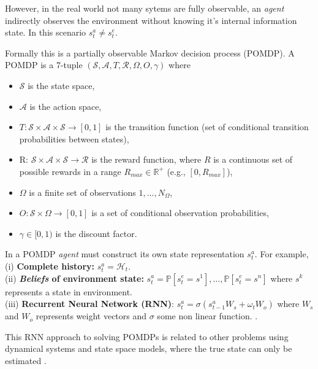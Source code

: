 \vspace{3mm}

However, in the real world not many sytems are fully observable, an {\em agent} indirectly observes the environment without knowing it's internal information state. In this scenario $s_t^a \neq s^e_t$.

Formally this is a partially observable Markov decision process (POMDP).
\vspace{5mm}
A POMDP is a 7-tuple $(\mathcal{S}, \mathcal{A}, T, \mathcal{R}, \Omega, O, \gamma)$ where
\begin{itemize}
  \item[] $\mathcal{S}$ is the state space,
  \item[] $\mathcal{A}$ is the action space,
  \item[] $T : \mathcal{S} \times \mathcal{A}\times \mathcal{S} \rightarrow [0, 1]$ is the transition function (set of conditional
  transition probabilities between states),
  \item[] R: $\mathcal{S} \times \mathcal{A}\times \mathcal{S} \rightarrow \mathcal{R}$ is the reward function, where $R$ is a continuous set of possible rewards in a range $R_{max} \in \mathbb{R}^+$ (e.g., $[0, R_{max}]$),
  \item[] $\Omega$ is a finite set of observations ${1, . . . , N_{\Omega}}$,
  \item[] $O : \mathcal{S} \times \Omega \rightarrow [0, 1]$ is a set of conditional observation probabilities,
  \item[] $\gamma \in  [0, 1)$ is the discount factor.
\end{itemize}


In a POMDP {\em agent} must construct its own state representation $s_t^a$. For example,\\
(i) \textbf{Complete history:} $s_t^a = \mathcal{H}_t$.\\
(ii) \textbf{{\em Beliefs} of environment state:} $s_t^a = \mathbb{P}[s_t^e = s^1],\ldots,\mathbb{P}[s_t^e = s^n]$ where $s^k$ represents a state in environment.\\
(iii) \textbf{Recurrent Neural Network (RNN)}: $s_t^a = \sigma(s_{t-1}^a W_s + \omega_t W_o)$ where $W_s$ and $W_o$ represents weight vectors and $\sigma$ some non linear function. \cite{wierstra2010recurrent, hausknecht2015deep, heess2015memory}.

This RNN approach to solving
POMDPs is related to other problems using dynamical systems
and state space models, where the true state can only be
estimated \cite{bertsekas2005dynamic}.


